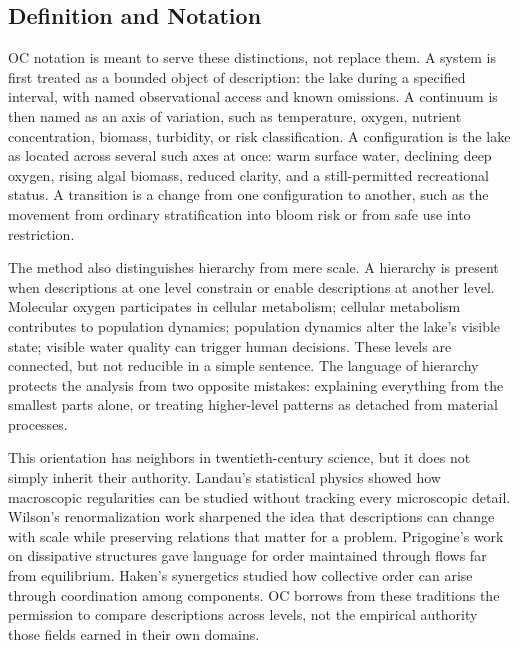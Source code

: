 \documentclass[11pt,a4paper,openany]{book}
\begin{document}
\subsection{Definition and Notation}
OC notation is meant to serve these distinctions, not replace them. A system is first treated as a bounded object of description: the lake during a specified interval, with named observational access and known omissions. A continuum is then named as an axis of variation, such as temperature, oxygen, nutrient concentration, biomass, turbidity, or risk classification. A configuration is the lake as located across several such axes at once: warm surface water, declining deep oxygen, rising algal biomass, reduced clarity, and a still-permitted recreational status. A transition is a change from one configuration to another, such as the movement from ordinary stratification into bloom risk or from safe use into restriction. \cite{wilson_renormalization,landau_stat_physics}\par
The method also distinguishes hierarchy from mere scale. A hierarchy is present when descriptions at one level constrain or enable descriptions at another level. Molecular oxygen participates in cellular metabolism; cellular metabolism contributes to population dynamics; population dynamics alter the lake's visible state; visible water quality can trigger human decisions. These levels are connected, but not reducible in a simple sentence. The language of hierarchy protects the analysis from two opposite mistakes: explaining everything from the smallest parts alone, or treating higher-level patterns as detached from material processes.\par
This orientation has neighbors in twentieth-century science, but it does not simply inherit their authority. Landau's statistical physics showed how macroscopic regularities can be studied without tracking every microscopic detail. Wilson's renormalization work sharpened the idea that descriptions can change with scale while preserving relations that matter for a problem. Prigogine's work on dissipative structures gave language for order maintained through flows far from equilibrium. Haken's synergetics studied how collective order can arise through coordination among components. OC borrows from these traditions the permission to compare descriptions across levels, not the empirical authority those fields earned in their own domains.\par
\end{document}
